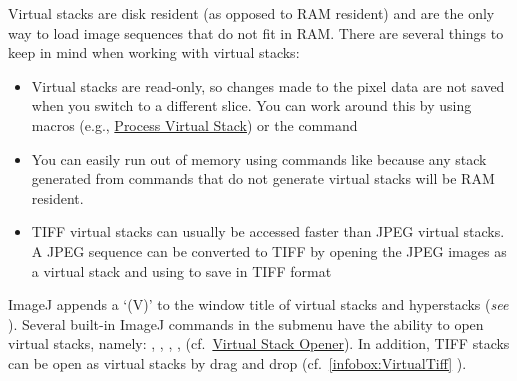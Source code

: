 Virtual
stacks are disk resident (as opposed to RAM
resident) and are the only way to load image sequences that do not
fit in RAM. There are several things to keep in mind when working
with virtual stacks:
\begin{itemize}
\item Virtual stacks are read-only, so changes made to the pixel data are
not saved when you switch to a different slice. You can work around
this by using macros (e.g., {\small \href{http://imagej.nih.gov/ij/macros/Process_Virtual_Stack.txt}{Process Virtual Stack}})
or the \textsf{}
command
\item You can easily run out of memory using commands like \textsf{}
because any stack generated from commands that do not generate virtual
stacks will be RAM resident.
\item TIFF virtual stacks can usually be accessed faster than JPEG
virtual stacks. A JPEG sequence can be converted to TIFF by opening
the JPEG images as a virtual stack and using \textsf{}
to save in TIFF format
\end{itemize}
ImageJ appends a `(V)' to the window title of virtual stacks and
hyperstacks (\emph{see} ). Several
built-in ImageJ commands in the \textsf{}
submenu have the ability to open virtual stacks, namely: ,
, ,\textsf{
},\textsf{ }
(cf.\ \href{http://imagej.nih.gov/ij/plugins/virtual-opener.html}{Virtual Stack Opener}).
In addition, TIFF stacks can be open as virtual stacks by drag and
drop (cf.\ \ref{infobox:VirtualTiff} ).



